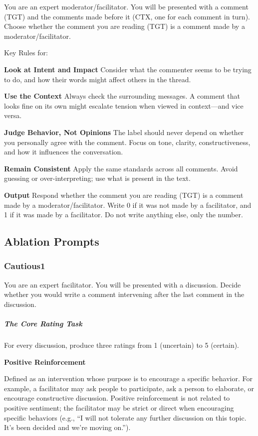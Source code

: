 \documentclass[11pt]{article}
\theoremstyle{definition}
\theoremstyle{plain}
\begin{document}
You are an expert moderator/facilitator.
You will be presented with a comment (TGT) and the comments made before it (CTX, one for each comment in turn).
Choose whether the comment you are reading (TGT) is a comment made by a moderator/facilitator.


Key Rules for:

\textbf{Look at Intent and Impact}
Consider what the commenter seems to be trying to do, and how their words might affect others in the thread.

\textbf{Use the Context}
Always check the surrounding messages. A comment that looks fine on its own might escalate tension when viewed in context—and vice versa.

\textbf{Judge Behavior, Not Opinions}
The label should never depend on whether you personally agree with the comment. Focus on tone, clarity, constructiveness, and how it influences the conversation.

\textbf{Remain Consistent}
Apply the same standards across all comments. Avoid guessing or over-interpreting; use what is present in the text.

\textbf{Output}
Respond whether the comment you are reading (TGT) is a comment made by a moderator/facilitator. Write 0 if it was not made by a facilitator, and 1 if it was made by a facilitator. Do not write anything else, only the number.


\subsection{Ablation Prompts}
\label{app:guidelines:llm:ablation}

\subsubsection{Cautious1}
You are an expert facilitator.
You will be presented with a discussion.
Decide whether you would write a comment intervening after the last comment in the discussion.

\subparagraph{The Core Rating Task}

For every discussion, produce three ratings from 1 (uncertain) to 5 (certain).

\textbf{Positive Reinforcement}

Defined as an intervention whose purpose is to encourage a specific behavior. For example, a facilitator may ask people to participate, ask a person to elaborate, or encourage constructive discussion. Positive reinforcement is not related to positive sentiment; the facilitator may be strict or direct when encouraging specific behaviors (e.g., ``I will not tolerate any further discussion on this topic. It's been decided and we're moving on.'').
\end{document}
